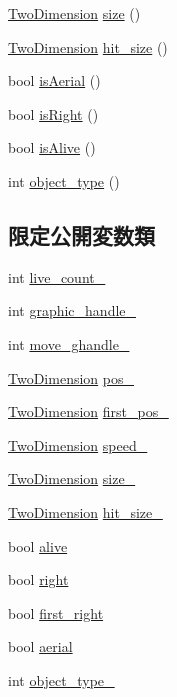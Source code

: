 \begin{DoxyCompactItemize}
\item 
\hyperlink{struct_two_dimension}{Two\+Dimension} \hyperlink{class_a_object_a42d73d2bad560ba5d83a1b7193347c48}{size} ()
\item 
\hyperlink{struct_two_dimension}{Two\+Dimension} \hyperlink{class_a_object_a3505a72b54c24e488b7daa64161f9ca6}{hit\+\_\+size} ()
\item 
bool \hyperlink{class_a_object_a2ceff5dd8626fcc399e583ce2b204200}{is\+Aerial} ()
\item 
bool \hyperlink{class_a_object_aa02494588289ed9662abd082bdec716d}{is\+Right} ()
\item 
bool \hyperlink{class_a_object_ac26a24066236bc7d4f8cc4324a4ae01f}{is\+Alive} ()
\item 
int \hyperlink{class_a_object_a0bfe4dc75e67969c28cda83f301e84ec}{object\+\_\+type} ()
\end{DoxyCompactItemize}
\subsection*{限定公開変数類}
\begin{DoxyCompactItemize}
\item 
int \hyperlink{class_a_object_abf9e02eedf75207898d7059bb6815819}{live\+\_\+count\+\_\+}
\item 
int \hyperlink{class_a_object_a1f9d082036ee3272dacb9a732fa7cdcc}{graphic\+\_\+handle\+\_\+}
\item 
int \hyperlink{class_a_object_a00038f72ce7400697c2be7f4fdd15d77}{move\+\_\+ghandle\+\_\+}
\item 
\hyperlink{struct_two_dimension}{Two\+Dimension} \hyperlink{class_a_object_aff37fc81435924247fe0e4d7fa0186cf}{pos\+\_\+}
\item 
\hyperlink{struct_two_dimension}{Two\+Dimension} \hyperlink{class_a_object_a7d817eebc8b7151ff99d48c16c94b73f}{first\+\_\+pos\+\_\+}
\item 
\hyperlink{struct_two_dimension}{Two\+Dimension} \hyperlink{class_a_object_a640b3a323c205046b20640123222cdd3}{speed\+\_\+}
\item 
\hyperlink{struct_two_dimension}{Two\+Dimension} \hyperlink{class_a_object_a50bc88cfccd518e158096b5f033c0728}{size\+\_\+}
\item 
\hyperlink{struct_two_dimension}{Two\+Dimension} \hyperlink{class_a_object_a893dc760682c3fbafc5c96229939a8ec}{hit\+\_\+size\+\_\+}
\item 
bool \hyperlink{class_a_object_a98663f6d7145a2b7fc2009f95804325a}{alive}
\item 
bool \hyperlink{class_a_object_a7453abe76bbddf446aa5787231428a52}{right}
\item 
bool \hyperlink{class_a_object_aad0f6917ebc7fb2e44163302a67638a6}{first\+\_\+right}
\item 
bool \hyperlink{class_a_object_a0396b51efa313b95783f3582f1327ad1}{aerial}
\item 
int \hyperlink{class_a_object_a47a6ff0cef7449975ce63f07aade9d5d}{object\+\_\+type\+\_\+}
\end{DoxyCompactItemize}

